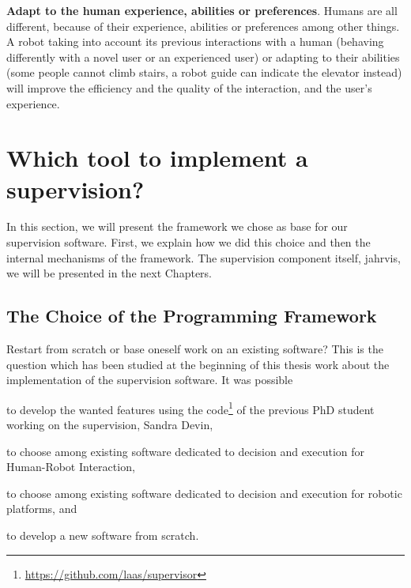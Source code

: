 \documentclass[a4paper,11pt,twoside]{StyleThese}
\begin{document}
\begin{bulletList}
	\item \textbf{Adapt to the human experience, abilities or preferences}. Humans are all different, because of their experience, abilities or preferences among other things. A robot taking into account its previous interactions with a human (\eg behaving differently with a novel user or an experienced user) or adapting to their abilities (\eg some people cannot climb stairs, a robot guide can indicate the elevator instead) will improve the efficiency and the quality of the interaction, and the user's experience.
\end{bulletList}


\section{Which tool to implement a supervision?}\label{chap4:sec:bdi}

In this section, we will present the framework we chose as base for our supervision software. First, we explain how we did this choice and then the internal mechanisms of the framework. The supervision component itself, \acrshort{jahrvis}, we will be presented in the next Chapters.

\subsection{The Choice of the Programming Framework}


Restart from scratch or base oneself work on an existing software? This is the question which has been studied at the beginning of this thesis work about the implementation of the supervision software. It was possible 
\begin{inlineEnumerate}
	\item to develop the wanted features using the code\footnote{\url{https://github.com/laas/supervisor}} of the previous PhD student working on the supervision, Sandra Devin,\label{chap4:list:sandra}
	\item to choose among existing software dedicated to decision and execution for Human-Robot Interaction,\label{chap4:list:soft_hri}
	\item to choose among existing software dedicated to decision and execution for robotic platforms, and\label{chap4:list:robot}
	\item to develop a new software from scratch.\label{chap4:list:new}
\end{inlineEnumerate}
\end{document}
